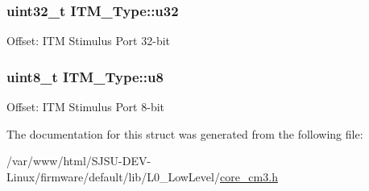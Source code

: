 \subsubsection[{\texorpdfstring{u32}{u32}}]{ uint32\+\_\+t I\+T\+M\+\_\+\+Type\+::u32}\hypertarget{structITM__Type_a6882fa5af67ef5c5dfb433b3b68939df}{}\label{structITM__Type_a6882fa5af67ef5c5dfb433b3b68939df}
Offset\+: I\+TM Stimulus Port 32-\/bit 
\subsubsection[{\texorpdfstring{u8}{u8}}]{ uint8\+\_\+t I\+T\+M\+\_\+\+Type\+::u8}\hypertarget{structITM__Type_abea77b06775d325e5f6f46203f582433}{}\label{structITM__Type_abea77b06775d325e5f6f46203f582433}
Offset\+: I\+TM Stimulus Port 8-\/bit 

The documentation for this struct was generated from the following file\+:\begin{DoxyCompactItemize}
\item 
/var/www/html/\+S\+J\+S\+U-\/\+D\+E\+V-\/\+Linux/firmware/default/lib/\+L0\+\_\+\+Low\+Level/\hyperlink{core__cm3_8h}{core\+\_\+cm3.\+h}\end{DoxyCompactItemize}
